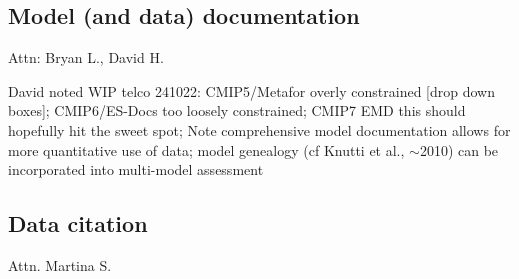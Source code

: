 \documentclass[gmd, preprint]{copernicus}
\newcommand{\mycomment}[1]{}
\def\cred#1{{\color{red}#1}}
\begin{document}
\mycomment{
The CMIP6 "data request" \citep{juckes_cmip6_2020} was the most comprehensively outlined preceded by three decades of evolution in climate model understanding. This history underpinned the development of the standard experimental protocols 
\citet{gates_amip_1991} - AMIP1
\citet{gates_amip_1993} - AMIP History Archive
\citet{gates_amip_1994} - AMIP Ensemble
\citet{gleckler_amip_1996} - AMIP 7 monthly mean and six-hourly output, plus ensembles/AMIP 2
\citet{gleckler_amip_1996-1} - AMIP number 8, STANDARD OUTPUT low and high frequency (6-hr)
https://pcmdi.llnl.gov/mips/amip/OUTPUT/WGNEDIAGS/index.html
\citet{taylor_pcmdi_2009}
\citet{taylor_pcmdi_2013}
\citet{juckes_baseline_2024}

FANGIO not multi-year (perpetual July)/January; AMIP1 success, multi-year SST/sea-ice (Russians and Chinese); AMIP2 next-level output, more high-frequency data, mean products (covariances; u/v-prime overbar - on the fly calculation) monthly mean timeseries (Boer \& Lambert 2008, clim dyn - relationship to Lorenz energy cycle)
CMIP2: https://pcmdi.llnl.gov/mips/cmip2/
CMIP3: https://pcmdi.llnl.gov/mips/cmip3/experiment.html
CMIP5: https://pcmdi.llnl.gov/mips/cmip5/requirements.html
}


\subsection{Model (and data) documentation}
\cred{Attn: Bryan L., David H.}

\cred{David noted WIP telco 241022: CMIP5/Metafor \citep{guilyardi_cmip5_2011} overly constrained [drop down boxes]; CMIP6/ES-Docs \citep{pascoe_documenting_2020} too loosely constrained; CMIP7 EMD this should hopefully hit the sweet spot; Note comprehensive model documentation allows for more quantitative use of data; model genealogy (cf Knutti et al., ${\sim}$2010) can be incorporated into multi-model assessment}


\subsection{Data citation}
\cred{Attn. Martina S.}
\end{document}
